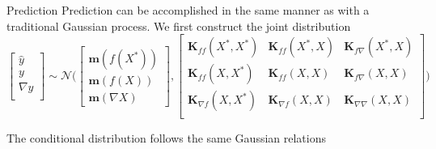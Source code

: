 \documentclass{beamer}
\begin{document}
\begin{frame}{Prediction}
    Prediction can be accomplished in the same manner as with a traditional Gaussian process. We first construct the joint distribution
\begin{equation*}
    \begin{bmatrix} 
    \hat{y}\\
    y\\
    \nabla y\\
    \end{bmatrix}
    \sim \mathcal{N}\bigg(
    \begin{bmatrix}
    \boldsymbol{m}(f(X^*)) \\
    \boldsymbol{m}(f(X)) \\
    \boldsymbol{m}(\nabla X)
    \end{bmatrix},
    \begin{bmatrix}
    \boldsymbol{K}_{ff}(X^*, X^*)     &\boldsymbol{K}_{ff}(X^*, X)  & \boldsymbol{K}_{f\nabla}(X^*, X)\\
    \boldsymbol{K}_{ff}(X, X^*)       &\boldsymbol{K}_{ff}(X, X)  & \boldsymbol{K}_{f\nabla}(X, X)\\
    \boldsymbol{K}_{\nabla f}(X, X^*) &\boldsymbol{K}_{\nabla f}(X, X) & \boldsymbol{K}_{\nabla \nabla}(X, X)\\
    \end{bmatrix}
    \bigg)
\end{equation*}

The conditional distribution follows the same Gaussian relations


\end{frame}
\end{document}
